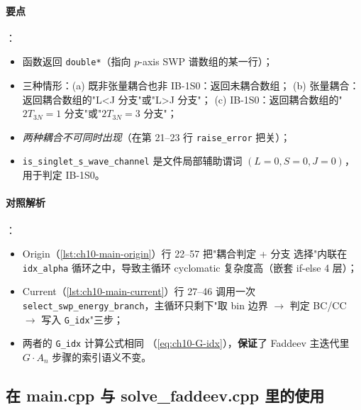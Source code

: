 \paragraph{要点}：
\begin{itemize}
  \item 函数返回 \texttt{double*}（指向 \(p\)-axis SWP 谱数组的某一行）；
  \item 三种情形：(a) 既非张量耦合也非 IB-1S0：返回未耦合数组；
        (b) 张量耦合：返回耦合数组的"L<J 分支"或"L>J 分支"；
        (c) IB-1S0：返回耦合数组的"\(2T_{3N}=1\) 分支"或"\(2T_{3N}=3\) 分支"；
  \item \emph{两种耦合不可同时出现}（在第 21--23 行 \texttt{raise\_error}
        把关）；
  \item \texttt{is\_singlet\_s\_wave\_channel} 是文件局部辅助谓词
        \((L=0, S=0, J=0)\)，用于判定 IB-1S0。
\end{itemize}





\paragraph{对照解析}：
\begin{itemize}
  \item Origin（\cref{lst:ch10-main-origin}）行 22--57 把"耦合判定 + 分支
        选择"内联在 \texttt{idx\_alpha} 循环之中，导致主循环 cyclomatic
        复杂度高（嵌套 if-else 4 层）；
  \item Current（\cref{lst:ch10-main-current}）行 27--46 调用一次
        \texttt{select\_swp\_energy\_branch}，主循环只剩下"取 bin 边界
        \(\to\) 判定 BC/CC \(\to\) 写入 \texttt{G\_idx}"三步；
  \item 两者的 \texttt{G\_idx} 计算公式相同
        （\cref{eq:ch10-G-idx}），\textbf{保证}了 Faddeev 主迭代里
        \(G \cdot A_n\) 步骤的索引语义不变。
\end{itemize}

\subsection{在 main.cpp 与 solve\_faddeev.cpp 里的使用}
\label{subsec:ch10-callers}

